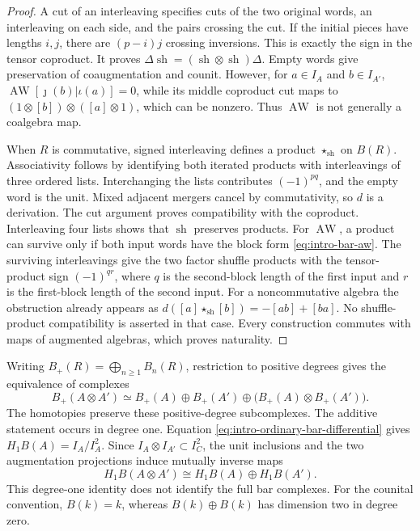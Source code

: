 \begin{proof}
A cut of an interleaving specifies cuts of the two original words,
an interleaving on each side, and the pairs crossing the cut.
If the initial pieces have lengths $i,j$, there are $(p-i)j$
crossing inversions. This is exactly the sign in the tensor coproduct.
It proves $\Delta\operatorname{sh}
=(\operatorname{sh}\otimes\operatorname{sh})\Delta$.
Empty words give preservation of coaugmentation and counit.
However, for $a\in I_A$ and $b\in I_{A'}$,
$\operatorname{AW}[\jmath(b)|\iota(a)]=0$, while its middle
coproduct cut maps to
$(1\otimes[b])\otimes([a]\otimes1)$, which can be nonzero.
Thus $\operatorname{AW}$ is not generally a coalgebra map.

When $R$ is commutative, signed interleaving defines a product
$\star_{\mathrm{sh}}$ on $B(R)$. Associativity follows by identifying both
iterated products with interleavings of three ordered lists.
Interchanging the lists contributes $(-1)^{pq}$, and the empty
word is the unit. Mixed adjacent mergers cancel by commutativity,
so $d$ is a derivation. The cut argument proves compatibility
with the coproduct. Interleaving four lists shows that
$\operatorname{sh}$ preserves products. For $\operatorname{AW}$,
a product can survive only if both input words have the block form
\eqref{eq:intro-bar-aw}. The surviving interleavings give the two
factor shuffle products with the tensor-product sign $(-1)^{qr}$,
where $q$ is the second-block length of the first input and $r$
is the first-block length of the second input.
For a noncommutative algebra the obstruction already appears as
$d([a]\star_{\mathrm{sh}}[b])=-[ab]+[ba]$. No shuffle-product compatibility
is asserted in that case. Every construction commutes with maps of
augmented algebras, which proves naturality.
\end{proof}

Writing $B_+(R)=\bigoplus_{n\geq1}B_n(R)$, restriction to positive
degrees gives the equivalence of complexes
\[
 B_+(A\otimes A')\simeq B_+(A)\oplus B_+(A')
                   \oplus\bigl(B_+(A)\otimes B_+(A')\bigr).
\]
The homotopies preserve these positive-degree subcomplexes.
The additive statement occurs in degree one. Equation
\eqref{eq:intro-ordinary-bar-differential} gives
$H_1B(A)=I_A/I_A^2$. Since $I_A\otimes I_{A'}\subset I_C^2$,
the unit inclusions and the two augmentation projections induce
mutually inverse maps
\[
 H_1B(A\otimes A')\cong H_1B(A)\oplus H_1B(A').
\]
This degree-one identity does not identify the full bar complexes.
For the counital convention, $B(k)=k$, whereas $B(k)\oplus B(k)$
has dimension two in degree zero.


